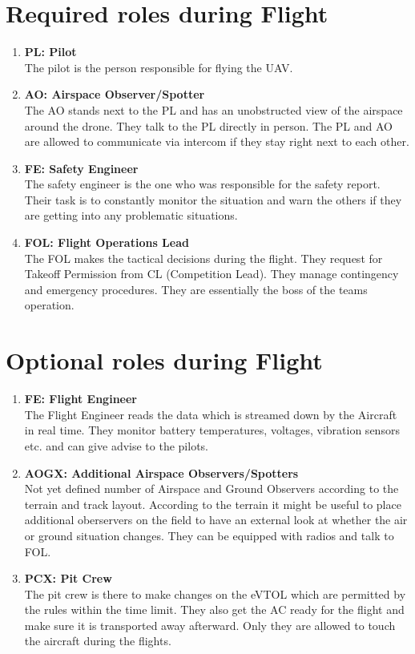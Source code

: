    \section{Required roles during Flight}
    \begin{enumerate}
      \item \textbf{PL: Pilot}\\The pilot is the person responsible for flying the UAV.
      \item \textbf{AO: Airspace Observer/Spotter}\\The AO stands next to the PL and has an unobstructed view of the airspace around the drone. They talk to the PL directly in person. The PL and AO are allowed to communicate via intercom if they stay right next to each other. 
      \item \textbf{FE: Safety Engineer}\\The safety engineer is the one who was responsible for the safety report. Their task is to constantly monitor the situation and warn the others if they are getting into any problematic situations. 
      \item \textbf{FOL: Flight Operations Lead}\\The FOL makes the tactical decisions during the flight. They request for Takeoff Permission from CL (Competition Lead). They manage contingency and emergency procedures. They are essentially the boss of the teams operation.
    \end{enumerate}

    \section{Optional roles during Flight}
    \begin{enumerate}
      \item \textbf{FE: Flight Engineer}\\The Flight Engineer reads the data which is streamed down by the Aircraft in real time. They monitor battery temperatures, voltages, vibration sensors etc. and can give advise to the pilots.
      \item \textbf{AOGX: Additional Airspace Observers/Spotters}\\Not yet defined number of Airspace and Ground Observers according to the terrain and track layout.
      According to the terrain it might be useful to place additional oberservers on the field to have an external look at whether the air or ground situation changes. They can be equipped with radios and talk to FOL.
      \item \textbf{PCX: Pit Crew }\\The pit crew is there to make changes on the eVTOL which are permitted by the rules within the time limit. They also get the AC ready for the flight and make sure it is transported away afterward. Only they are allowed to touch the aircraft during the flights. 
    \end{enumerate}

